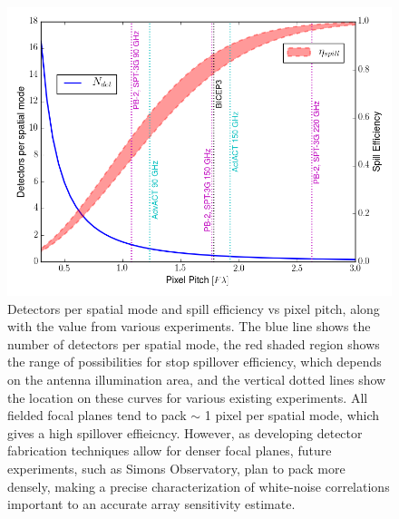 \begin{figure}[!ht]
    \includegraphics[width=\linewidth]{WhiteNoiseCorrelations/Figures/stopEff_Ndet.png}
    \caption[Detectors per spatial mode and spill efficiency vs pixel pitch, along with the value from various experiments]{Detectors per spatial mode and spill efficiency vs pixel pitch, along with the value from various experiments. The blue line shows the number of detectors per spatial mode, the red shaded region shows the range of possibilities for stop spillover efficiency, which depends on the antenna illumination area, and the vertical dotted lines show the location on these curves for various existing experiments. All fielded focal planes tend to pack $\sim$ 1 pixel per spatial mode, which gives a high spillover effieicncy. However, as developing detector fabrication techniques allow for denser focal planes, future experiments, such as Simons Observatory, plan to pack more densely, making a precise characterization of white-noise correlations important to an accurate array sensitivity estimate.}
    \label{fig:field_flambda_spacing}
\end{figure}
